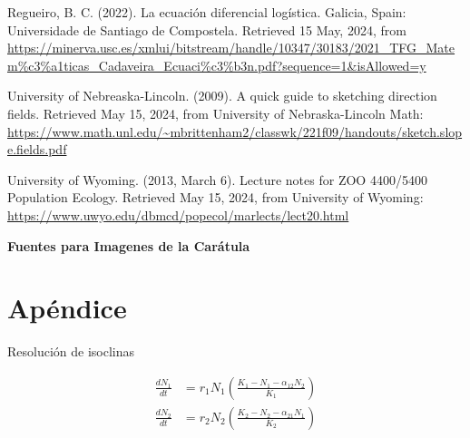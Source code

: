 \documentclass{article}
\begin{document}
\noindent Regueiro, B. C. (2022). La ecuación diferencial logística. Galicia, Spain: Universidade de Santiago de Compostela. Retrieved 15 May, 2024, from \url{https://minerva.usc.es/xmlui/bitstream/handle/10347/30183/2021_TFG_Matem%c3%a1ticas_Cadaveira_Ecuaci%c3%b3n.pdf?sequence=1&isAllowed=y}
\vspace{1\baselineskip}

\noindent University of Nebreaska-Lincoln. (2009). A quick guide to sketching direction fields. Retrieved May 15, 2024, from University of Nebraska-Lincoln Math: \url{https://www.math.unl.edu/~mbrittenham2/classwk/221f09/handouts/sketch.slope.fields.pdf} 
\vspace{1\baselineskip}

\noindent University of Wyoming. (2013, March 6). Lecture notes for ZOO 4400/5400 Population Ecology. Retrieved May 15, 2024, from University of Wyoming: \url{https://www.uwyo.edu/dbmcd/popecol/marlects/lect20.html} 

\vspace{2\baselineskip}

\noindent \textbf{Fuentes para Imagenes de la Carátula}
\vspace{1\baselineskip}

\vspace{1\baselineskip}

 \vspace{1\baselineskip}

 \vspace{1\baselineskip}




\section*{Apéndice}

 Resolución de isoclinas
\vspace{1\baselineskip}

\begin{align}
\frac{dN_1}{dt} &= r_1N_1\left(\frac{K_1 - N_1 - \alpha_{12}N_2}{K_1}\right) \label{eq:N1} \\
\frac{dN_2}{dt} &= r_2N_2\left(\frac{K_2 - N_2 - \alpha_{21}N_1}{K_2}\right) \label{eq:N2}
\end{align}
\end{document}
